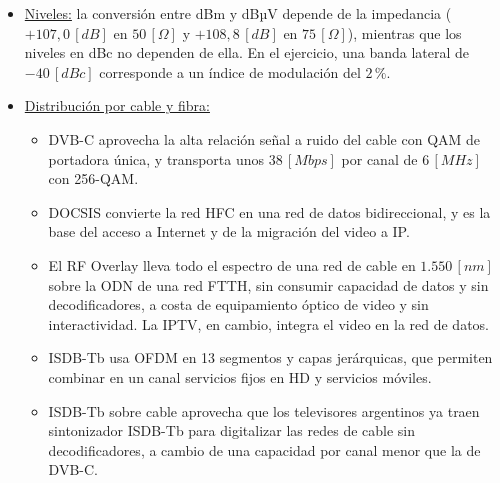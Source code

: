 \begin{itemize}
    \item \underline{Niveles:} la conversión entre dBm y dBµV depende de la impedancia ($+107{,}0 \, [dB]$ en $50 \, [\Omega]$ y $+108{,}8 \, [dB]$ en $75 \, [\Omega]$), mientras que los niveles en dBc no dependen de ella. En el ejercicio, una banda lateral de $-40 \, [dBc]$ corresponde a un índice de modulación del $2 \,\text{\%}$.
    \item \underline{Distribución por cable y fibra:}
    \begin{itemize}
        \item DVB-C aprovecha la alta relación señal a ruido del cable con QAM de portadora única, y transporta unos $38 \, [Mbps]$ por canal de $6 \, [MHz]$ con 256-QAM.
        \item DOCSIS convierte la red HFC en una red de datos bidireccional, y es la base del acceso a Internet y de la migración del video a IP.
        \item El RF Overlay lleva todo el espectro de una red de cable en $1.550 \, [nm]$ sobre la ODN de una red FTTH, sin consumir capacidad de datos y sin decodificadores, a costa de equipamiento óptico de video y sin interactividad. La IPTV, en cambio, integra el video en la red de datos.
        \item ISDB-Tb usa OFDM en 13 segmentos y capas jerárquicas, que permiten combinar en un canal servicios fijos en HD y servicios móviles.
        \item ISDB-Tb sobre cable aprovecha que los televisores argentinos ya traen sintonizador ISDB-Tb para digitalizar las redes de cable sin decodificadores, a cambio de una capacidad por canal menor que la de DVB-C.
    \end{itemize}
\end{itemize}

